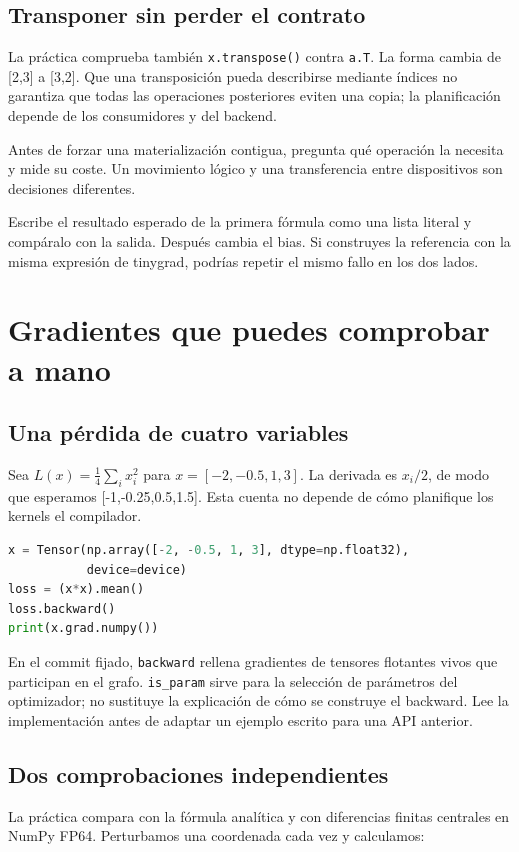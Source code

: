 \documentclass[12pt,a4paper,oneside]{report}
\begin{document}
\section{Transponer sin perder el contrato}
La práctica comprueba también \texttt{x.transpose()} contra \texttt{a.T}. La forma cambia de [2,3] a [3,2]. Que una transposición pueda describirse mediante índices no garantiza que todas las operaciones posteriores eviten una copia; la planificación depende de los consumidores y del backend.

Antes de forzar una materialización contigua, pregunta qué operación la necesita y mide su coste. Un movimiento lógico y una transferencia entre dispositivos son decisiones diferentes.

\begin{practica}
Escribe el resultado esperado de la primera fórmula como una lista literal y compáralo con la salida. Después cambia el bias. Si construyes la referencia con la misma expresión de tinygrad, podrías repetir el mismo fallo en los dos lados.

\end{practica}
\chapter{Gradientes que puedes comprobar a mano}
\section{Una pérdida de cuatro variables}
Sea $L(x)=\frac14\sum_i x_i^2$ para $x=[-2,-0.5,1,3]$. La derivada es $x_i/2$, de modo que esperamos [-1,-0.25,0.5,1.5]. Esta cuenta no depende de cómo planifique los kernels el compilador.

\begin{lstlisting}[language=Python]
x = Tensor(np.array([-2, -0.5, 1, 3], dtype=np.float32),
           device=device)
loss = (x*x).mean()
loss.backward()
print(x.grad.numpy())
\end{lstlisting}
En el commit fijado, \texttt{backward} rellena gradientes de tensores flotantes vivos que participan en el grafo. \texttt{is\_param} sirve para la selección de parámetros del optimizador; no sustituye la explicación de cómo se construye el backward. Lee la implementación antes de adaptar un ejemplo escrito para una API anterior.

\section{Dos comprobaciones independientes}
La práctica compara con la fórmula analítica y con diferencias finitas centrales en NumPy FP64. Perturbamos una coordenada cada vez y calculamos:
\end{document}
